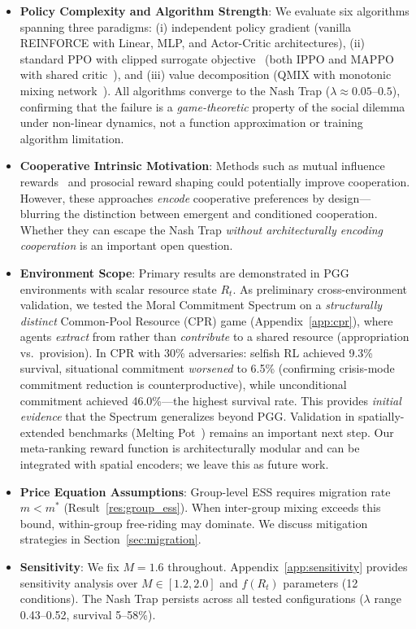 \documentclass{article}
\begin{document}
\begin{itemize}
    \item \textbf{Policy Complexity and Algorithm Strength}: We evaluate six algorithms spanning three paradigms: (i) independent policy gradient (vanilla REINFORCE with Linear, MLP, and Actor-Critic architectures), (ii) standard PPO with clipped surrogate objective~\citep{schulman2017proximal} (both IPPO and MAPPO with shared critic~\citep{yu2022surprising}), and (iii) value decomposition (QMIX with monotonic mixing network~\citep{rashid2018qmix}).
    All algorithms converge to the Nash Trap ($\lambda \approx 0.05$--$0.5$), confirming that the failure is a \emph{game-theoretic} property of the social dilemma under non-linear dynamics, not a function approximation or training algorithm limitation.
    \item \textbf{Cooperative Intrinsic Motivation}: Methods such as mutual influence rewards~\citep{jaques2019social} and prosocial reward shaping could potentially improve cooperation. However, these approaches \emph{encode} cooperative preferences by design---blurring the distinction between emergent and conditioned cooperation. Whether they can escape the Nash Trap \emph{without architecturally encoding cooperation} is an important open question.
    \item \textbf{Environment Scope}: Primary results are demonstrated in PGG environments with scalar resource state $R_t$.
    As preliminary cross-environment validation, we tested the Moral Commitment Spectrum on a \emph{structurally distinct} Common-Pool Resource (CPR) game (Appendix~\ref{app:cpr}), where agents \emph{extract} from rather than \emph{contribute} to a shared resource (appropriation vs.\ provision). In CPR with 30\% adversaries: selfish RL achieved 9.3\% survival, situational commitment \emph{worsened} to 6.5\% (confirming crisis-mode commitment reduction is counterproductive), while unconditional commitment achieved 46.0\%---the highest survival rate. This provides \emph{initial evidence} that the Spectrum generalizes beyond PGG.
    Validation in spatially-extended benchmarks (Melting Pot~\citep{leibo2021scalable}) remains an important next step.
    Our meta-ranking reward function is architecturally modular and can be integrated with spatial encoders; we leave this as future work.
    \item \textbf{Price Equation Assumptions}: Group-level ESS requires migration rate $m < m^*$ (Result~\ref{res:group_ess}).
    When inter-group mixing exceeds this bound, within-group free-riding may dominate.
    We discuss mitigation strategies in Section~\ref{sec:migration}.
    \item \textbf{Sensitivity}: We fix $M=1.6$ throughout.
    Appendix~\ref{app:sensitivity} provides sensitivity analysis over $M \in [1.2, 2.0]$ and $f(R_t)$ parameters (12 conditions). The Nash Trap persists across all tested configurations ($\lambda$ range 0.43--0.52, survival 5--58\%).
\end{itemize}
\end{document}

